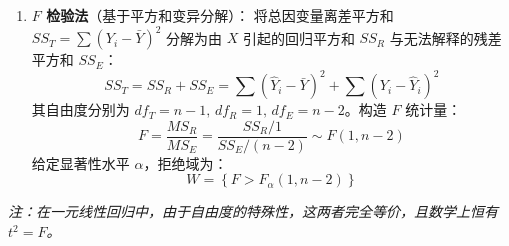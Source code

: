 \documentclass[a4paper]{ctexart}
\begin{document}
\begin{itemize}
\begin{enumerate}
        \item \textbf{$F$ 检验法}（基于平方和变异分解）：
        将总因变量离差平方和 $SS_T = \sum(Y_i - \bar{Y})^2$ 分解为由 $X$ 引起的回归平方和 $SS_R$ 与无法解释的残差平方和 $SS_E$：
        \[ SS_T = SS_R + SS_E = \sum (\hat{Y}_i - \bar{Y})^2 + \sum (Y_i - \hat{Y}_i)^2 \]
        其自由度分别为 $df_T = n-1, \, df_R = 1, \, df_E = n-2$。构造 $F$ 统计量：
        \[ F = \frac{MS_R}{MS_E} = \frac{SS_R / 1}{SS_E / (n - 2)} \sim F(1, n - 2) \]
        给定显著性水平 $\alpha$，拒绝域为：
        \[ W = \left\{ F > F_{\alpha}(1, n - 2) \right\} \]
    \end{enumerate}
    \textit{注：在一元线性回归中，由于自由度的特殊性，这两者完全等价，且数学上恒有 $t^2 = F$。}
\end{itemize}
\end{document}
